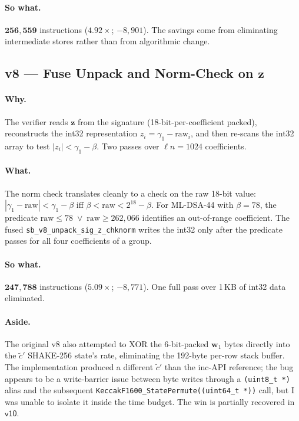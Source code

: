 \documentclass[11pt,a4paper]{article}
\begin{document}
\paragraph{So what.} $\mathbf{256{,}559}$ instructions
($\mathbf{4.92\times}$; $-8{,}901$). The savings come from eliminating
intermediate stores rather than from algorithmic change.

\subsection{v8 --- Fuse Unpack and Norm-Check on \texorpdfstring{$\mathbf{z}$}{z}}

\paragraph{Why.} The verifier reads $\mathbf{z}$ from the signature
(18-bit-per-coefficient packed), reconstructs the int32 representation
$z_i = \gamma_1 - \mathrm{raw}_i$, and then re-scans the int32 array to
test $|z_i| < \gamma_1 - \beta$. Two passes over $\ell n = 1024$
coefficients.

\paragraph{What.} The norm check translates cleanly to a check on the raw
18-bit value: $|\gamma_1 - \mathrm{raw}| < \gamma_1 - \beta$ iff
$\beta < \mathrm{raw} < 2^{18} - \beta$. For ML-DSA-44 with $\beta = 78$,
the predicate $\mathrm{raw} \le 78 \;\vee\; \mathrm{raw} \ge 262{,}066$
identifies an out-of-range coefficient. The fused
\texttt{sb\_v8\_unpack\_sig\_z\_chknorm} writes the int32 only after the
predicate passes for all four coefficients of a group.

\paragraph{So what.} $\mathbf{247{,}788}$ instructions
($\mathbf{5.09\times}$; $-8{,}771$). One full pass over 1\,KB of int32
data eliminated.

\paragraph{Aside.} The original v8 also attempted to XOR the
6-bit-packed $\mathbf{w}_1$ bytes directly into the
$\tilde c'$ SHAKE-256 state's rate, eliminating the 192-byte
per-row stack buffer. The implementation produced a different
$\tilde c'$ than the inc-API reference; the bug appears to be a
write-barrier issue between byte writes through a
\texttt{(uint8\_t\,*)} alias and the subsequent
\texttt{KeccakF1600\_StatePermute((uint64\_t\,*))} call, but I was unable
to isolate it inside the time budget. The win is partially recovered in
$\textsf{v10}$.
\end{document}
